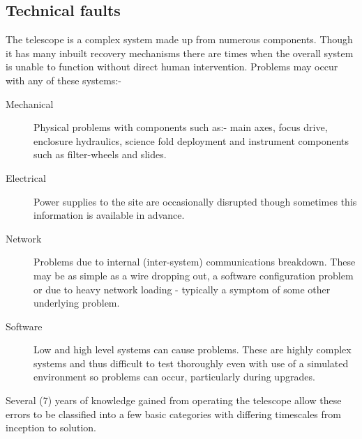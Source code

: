 \subsection{Technical faults}
The telescope is a complex system made up from numerous components. Though it has many inbuilt recovery mechanisms there are times when the overall system is unable to function without direct human intervention. Problems may occur with any of these systems:-

\begin{description}
\item [Mechanical] Physical problems with components such as:- main axes, focus drive, enclosure hydraulics, science fold deployment and instrument components such as filter-wheels and slides.

\item [Electrical] Power supplies to the site are occasionally disrupted though sometimes this information is available in advance.

\item [Network] Problems due to internal (inter-system) communications breakdown. These may be as simple as a wire dropping out, a software configuration problem or due to heavy network loading - typically a symptom of some other underlying problem. 

\item [Software] Low and high level systems can cause problems. These are highly complex systems and thus difficult to test thoroughly even with use of a simulated environment so problems can occur, particularly during upgrades. 

\end{description}

Several (7) years of knowledge gained from operating the telescope allow these errors to be classified into a few basic categories with differing timescales from inception to solution.

